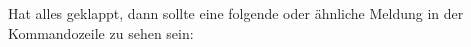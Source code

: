 \documentclass[ngerman,oneside, a4letter]{article}
\begin{document}
\begin{center}
\end{center}

\pagebreak
\noindent Hat alles geklappt, dann sollte eine folgende oder ähnliche Meldung in der Kommandozeile zu sehen sein:
\begin{center}
\end{center}

\pagebreak
\end{document}
